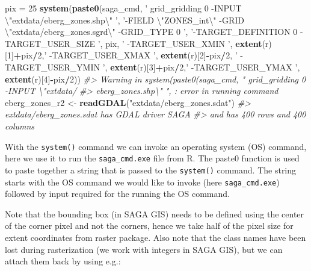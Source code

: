 \documentclass[graybox,natbib,nospthms,UStrade]{svmono}
\newenvironment{Shaded}{\begin{snugshade}}{\end{snugshade}}
\newcommand{\CharTok}[1]{\textcolor[rgb]{0.5,0.5,0.5}{#1}}
\newcommand{\CommentTok}[1]{\textcolor[rgb]{0.37,0.37,0.37}{\textit{#1}}}
\newcommand{\DecValTok}[1]{\textcolor[rgb]{0.06,0.06,0.06}{#1}}
\newcommand{\KeywordTok}[1]{\textcolor[rgb]{0.27,0.27,0.27}{\textbf{#1}}}
\newcommand{\NormalTok}[1]{#1}
\newcommand{\OperatorTok}[1]{\textcolor[rgb]{0.43,0.43,0.43}{\textbf{#1}}}
\newcommand{\StringTok}[1]{\textcolor[rgb]{0.5,0.5,0.5}{#1}}
\begin{document}
\begin{Shaded}
\begin{Highlighting}[]
\NormalTok{pix =}\StringTok{ }\DecValTok{25}
\KeywordTok{system}\NormalTok{(}\KeywordTok{paste0}\NormalTok{(saga_cmd, }\StringTok{' grid_gridding 0 -INPUT }\CharTok{\textbackslash{}"}\StringTok{extdata/eberg_zones.shp}\CharTok{\textbackslash{}"}\StringTok{ '}\NormalTok{,}
      \StringTok{'-FIELD }\CharTok{\textbackslash{}"}\StringTok{ZONES_int}\CharTok{\textbackslash{}"}\StringTok{ -GRID }\CharTok{\textbackslash{}"}\StringTok{extdata/eberg_zones.sgrd}\CharTok{\textbackslash{}"}\StringTok{ -GRID_TYPE 0 '}\NormalTok{,}
      \StringTok{'-TARGET_DEFINITION 0 -TARGET_USER_SIZE '}\NormalTok{, pix, }\StringTok{' -TARGET_USER_XMIN '}\NormalTok{, }
      \KeywordTok{extent}\NormalTok{(r)[}\DecValTok{1}\NormalTok{]}\OperatorTok{+}\NormalTok{pix}\OperatorTok{/}\DecValTok{2}\NormalTok{,}\StringTok{' -TARGET_USER_XMAX '}\NormalTok{, }\KeywordTok{extent}\NormalTok{(r)[}\DecValTok{2}\NormalTok{]}\OperatorTok{-}\NormalTok{pix}\OperatorTok{/}\DecValTok{2}\NormalTok{, }
      \StringTok{' -TARGET_USER_YMIN '}\NormalTok{, }\KeywordTok{extent}\NormalTok{(r)[}\DecValTok{3}\NormalTok{]}\OperatorTok{+}\NormalTok{pix}\OperatorTok{/}\DecValTok{2}\NormalTok{,}\StringTok{' -TARGET_USER_YMAX '}\NormalTok{, }
      \KeywordTok{extent}\NormalTok{(r)[}\DecValTok{4}\NormalTok{]}\OperatorTok{-}\NormalTok{pix}\OperatorTok{/}\DecValTok{2}\NormalTok{))}
\CommentTok{#> Warning in system(paste0(saga_cmd, " grid_gridding 0 -INPUT \textbackslash{}"extdata/}
\CommentTok{#> eberg_zones.shp\textbackslash{}" ", : error in running command}
\NormalTok{eberg_zones_r2 <-}\StringTok{ }\KeywordTok{readGDAL}\NormalTok{(}\StringTok{"extdata/eberg_zones.sdat"}\NormalTok{)}
\CommentTok{#> extdata/eberg_zones.sdat has GDAL driver SAGA }
\CommentTok{#> and has 400 rows and 400 columns}
\end{Highlighting}
\end{Shaded}

With the \texttt{system()} command we can invoke an operating system (OS) command, here we use it to run the \texttt{saga\_cmd.exe} file from R. The paste0 function is used to paste together a string that is passed to the \texttt{system()} command. The string starts with the OS command we would like to invoke (here \texttt{saga\_cmd.exe}) followed by input required for the running the OS command.

Note that the bounding box (in SAGA GIS) needs to be defined using the center of the corner pixel and not the corners, hence we take half of the pixel size for extent coordinates from raster package. Also note that the class names have been lost during rasterization (we work with integers in SAGA GIS), but we can attach them back by using e.g.:
\end{document}
